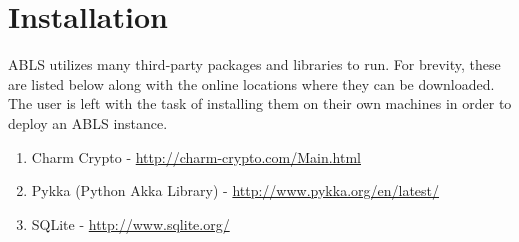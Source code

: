\section{Installation}

ABLS utilizes many third-party packages and libraries to run. For brevity, these are listed below
along with the online locations where they can be downloaded. The user is left with the task of 
installing them on their own machines in order to deploy an ABLS instance.

\begin{enumerate}
	\item Charm Crypto - \url{http://charm-crypto.com/Main.html}
	\item Pykka (Python Akka Library) - \url{http://www.pykka.org/en/latest/}
	\item SQLite - \url{http://www.sqlite.org/}
\end{enumerate}
